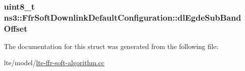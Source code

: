 \subsubsection[{\texorpdfstring{dl\+Egde\+Sub\+Band\+Offset}{dlEgdeSubBandOffset}}]{\setlength{\rightskip}{0pt plus 5cm}uint8\+\_\+t ns3\+::\+Ffr\+Soft\+Downlink\+Default\+Configuration\+::dl\+Egde\+Sub\+Band\+Offset}\hypertarget{structns3_1_1FfrSoftDownlinkDefaultConfiguration_ad497c93a2b0b7b00aaa88641066e57bb}{}\label{structns3_1_1FfrSoftDownlinkDefaultConfiguration_ad497c93a2b0b7b00aaa88641066e57bb}


The documentation for this struct was generated from the following file\+:\begin{DoxyCompactItemize}
\item 
lte/model/\hyperlink{lte-ffr-soft-algorithm_8cc}{lte-\/ffr-\/soft-\/algorithm.\+cc}\end{DoxyCompactItemize}
